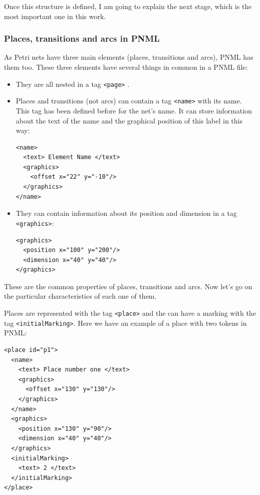 Once this structure is defined, I am going to explain the next stage, which
is the most important one in this work. 

\subsubsection{Places, transitions and arcs in PNML}

As Petri nets have three main elements (places, transitions
and arcs), PNML has them too. These three elements have several things in common in a PNML file:
\begin{itemize}
  \item They are all nested in a tag \texttt{<page>} .


  \item Places and transitions (not arcs) can contain a tag \texttt{<name>} with its name. This tag has been defined before for the net's name. It
can store information about the text of the name and the graphical position
of this label in this way:
\begin{lstlisting}
<name>
  <text> Element Name </text>
  <graphics>
    <offset x="22" y="-10"/>
  </graphics>
</name>
\end{lstlisting}
   \item They can contain information about its position and dimension in
a tag \texttt{<graphics>}:
\begin{lstlisting}
<graphics>
  <position x="100" y="200"/>
  <dimension x="40" y="40"/>
</graphics>
\end{lstlisting}
\end{itemize}


These are the common properties of places, transitions and arcs. Now let's
go on the particular characteristics of each one of them.

Places are represented with the tag \texttt{<place>} and the can have a marking with the tag \texttt{<initialMarking>}.
Here we have an example of a place with two tokens in PNML: 

\begin{lstlisting}[label=pnml_place,caption=PNML representation
for places]
<place id="p1">
  <name>
    <text> Place number one </text>
    <graphics>
      <offset x="130" y="130"/>
    </graphics>
  </name>
  <graphics>
    <position x="130" y="90"/>
    <dimension x="40" y="40"/>
  </graphics>
  <initialMarking>
    <text> 2 </text>
  </initialMarking>
</place>
\end{lstlisting}

